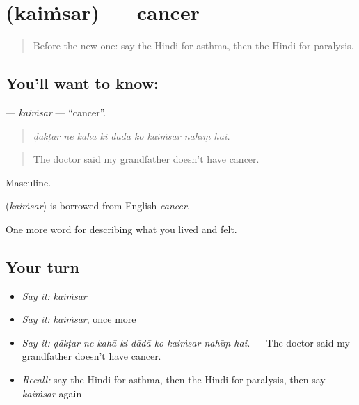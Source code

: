 \section[\texorpdfstring{\hi{कैंसर} (kaiṁsar)}{कैंसर (kaiṁsar)}]{ (kaiṁsar) — cancer}

\label{lesson:HI-C493-kaimsar}



\begin{quote}
Before the new one: say the Hindi for asthma, then the Hindi for paralysis.
\end{quote}

\subsection*{You'll want to know: }
\textbf{} — \emph{kaiṁsar} — \textquotedblleft{}cancer\textquotedblright{}.

\begin{quote}
        
\end{quote}

\begin{quote}
\emph{ḍākṭar ne kahā ki dādā ko kaiṁsar nahīṃ hai.}
\end{quote}

\begin{quote}
The doctor said my grandfather doesn't have cancer.
\end{quote}

Masculine.

\begin{cousinweb}
\textbf{} (\emph{kaiṁsar}) is borrowed from English \emph{cancer}.
\end{cousinweb}

\begin{grammarlens}[title={What you've built}]
One more word for describing what you lived and felt.
\end{grammarlens}

\subsection*{Your turn}
\begin{itemize}
\raggedright
  \item \emph{Say it:} \emph{kaiṁsar}
  \item \emph{Say it:} \emph{kaiṁsar}, once more
  \item \emph{Say it:} \emph{ḍākṭar ne kahā ki dādā ko kaiṁsar nahīṃ hai.} — The doctor said my grandfather doesn't have cancer.
  \item \emph{Recall:} say the Hindi for asthma, then the Hindi for paralysis, then say \emph{kaiṁsar} again
\end{itemize}

